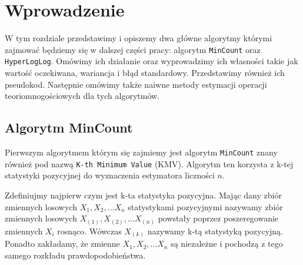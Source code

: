 \chapter{Wprowadzenie}
\thispagestyle{chapterBeginStyle}
\label{rozdzial1}

W tym rozdziale przedstawimy i opiszemy dwa główne algorytmy którymi zajmować będziemy się w dalszej części pracy: algorytm \texttt{MinCount} oraz \texttt{HyperLogLog}. Omówimy ich działanie oraz wyprowadzimy ich własności takie jak wartość oczekiwana, wariancja i błąd standardowy. Przedstawimy również ich pseudokod. Następnie omówimy także naiwne metody estymacji operacji teoriomnogościowych dla tych algorytmów.

\section{Algorytm MinCount}

Pierwszym algorytmem którym się zajmiemy jest algorytm \texttt{MinCount} znany również pod nazwą \texttt{K-th Minimum Value} (KMV). Algorytm ten korzysta z k-tej statystyki pozycyjnej do wyznaczenia estymatora liczności $n$.

Zdefiniujmy najpierw czym jest k-ta statystyka pozycyjna. Mając dany zbiór zmiennych losowych $X_1, X_2, \dots X_n$ statystykami pozycyjnymi nazywamy zbiór zmiennych losowych  $X_{(1)}, X_{(2)}, \dots X_{(n)}$ powstały poprzez poszeregowanie zmiennych $X_i$ rosnąco. Wówczas $X_{(k)}$ nazywamy k-tą statystyką pozycyjną. Ponadto zakładamy, że zmienne $X_1, X_2, \dots X_n$ są niezależne i pochodzą z tego samego rozkładu prawdopodobieństwa.

